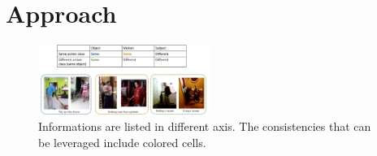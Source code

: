 \vspace{-0.4\baselineskip}
\section{Approach}
\vspace{-0.4\baselineskip}
\label{sec:approach}

\begin{figure}
\includegraphics[width=0.5\textwidth]{figures/regularization_analysis.pdf}
\caption{Informations are listed in different axis. The consistencies that can be leveraged include colored cells.}
\label{fig:analysis}
\end{figure}

